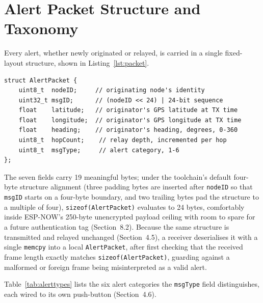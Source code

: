 \documentclass[12pt,a4paper]{report}
\begin{document}
\section{Alert Packet Structure and Taxonomy}
Every alert, whether newly originated or relayed, is carried in a single fixed-layout structure, shown in Listing~\ref{lst:packet}.

\begin{lstlisting}[caption={The AlertPacket structure (\texttt{include/packet\_structure.h})}, label={lst:packet}]
struct AlertPacket {
    uint8_t  nodeID;     // originating node's identity
    uint32_t msgID;      // (nodeID << 24) | 24-bit sequence
    float    latitude;   // originator's GPS latitude at TX time
    float    longitude;  // originator's GPS longitude at TX time
    float    heading;    // originator's heading, degrees, 0-360
    uint8_t  hopCount;    // relay depth, incremented per hop
    uint8_t  msgType;     // alert category, 1-6
};
\end{lstlisting}

The seven fields carry 19 meaningful bytes; under the toolchain's default four-byte structure alignment (three padding bytes are inserted after \texttt{nodeID} so that \texttt{msgID} starts on a four-byte boundary, and two trailing bytes pad the structure to a multiple of four), \texttt{sizeof(AlertPacket)} evaluates to 24 bytes, comfortably inside ESP-NOW's 250-byte unencrypted payload ceiling with room to spare for a future authentication tag (Section~8.2). Because the same structure is transmitted and relayed unchanged (Section~4.5), a receiver deserialises it with a single \texttt{memcpy} into a local \texttt{AlertPacket}, after first checking that the received frame length exactly matches \texttt{sizeof(AlertPacket)}, guarding against a malformed or foreign frame being misinterpreted as a valid alert.

Table~\ref{tab:alerttypes} lists the six alert categories the \texttt{msgType} field distinguishes, each wired to its own push-button (Section~4.6).
\end{document}
